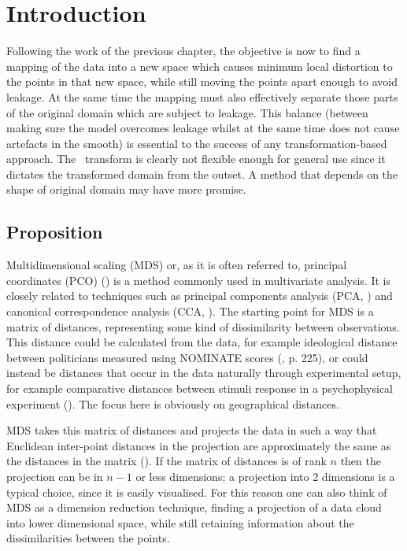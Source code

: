 \label{chap-mds}
\section{Introduction}

Following the work of the previous chapter, the objective is now to find a mapping of the data into a new space which causes minimum local distortion to the points in that new space, while still moving the points apart enough to avoid leakage. At the same time the mapping must also effectively separate those parts of the original domain which are subject to leakage. This balance (between making sure the model overcomes leakage whilst at the same time does not cause artefacts in the smooth) is essential to the success of any transformation-based approach. The \sch\ transform is clearly not flexible enough for general use since it dictates the transformed domain from the outset. A method that depends on the shape of original domain may have more promise.

\subsection{Proposition}

Multidimensional scaling (MDS) or, as it is often referred to, principal coordinates (PCO) (\cite{gower1966}) is a method commonly used in multivariate analysis. It is closely related to techniques such as principal\label{cor-r30} components analysis (PCA, \cite[p. 200]{chatfieldcollins}) and canonical correspondence analysis (CCA, \cite{terbraak}). The starting point for MDS is a matrix of distances, representing some kind of dissimilarity between observations. This distance could be calculated from the data, for example ideological distance between politicians measured using NOMINATE scores (\cite{quantss}, p. 225), or could instead be distances that occur in the data naturally through experimental setup,  for example comparative distances between stimuli response in a psychophysical experiment (\cite{torgerson}). The focus here is obviously on geographical distances.

MDS takes this matrix of distances and projects the data in such a way that Euclidean inter-point distances in the projection are approximately the same as the distances in the matrix (\cite[p. 187]{chatfieldcollins}). If the matrix of distances is of rank $n$ then the projection can be in $n-1$ or less dimensions; a projection into 2 dimensions is a typical choice, since it is easily visualised. For this reason one can also think of MDS as a dimension reduction technique, finding a projection of a data cloud into lower dimensional space, while still retaining information about the dissimilarities between the points.

